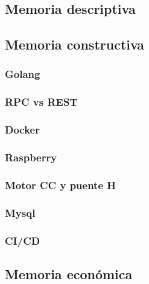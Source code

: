 \subsection{Memoria descriptiva}
	
\subsection{Memoria constructiva}
	\subsubsection{Golang}
		
	\subsubsection{RPC vs REST}
		
	\subsubsection{Docker}
		
	\subsubsection{Raspberry}
	\subsubsection{Motor CC y puente H}
	\subsubsection{Mysql}
	\subsubsection{CI/CD}
\subsection{Memoria económica}